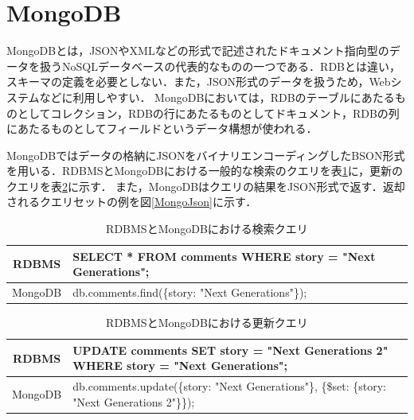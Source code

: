 \documentclass[a4paper,11pt]{ujreport}
\begin{document}
\section{MongoDB}
MongoDBとは，JSONやXMLなどの形式で記述されたドキュメント指向型のデータを扱うNoSQLデータベースの代表的なものの一つである．RDBとは違い，スキーマの定義を必要としない\cite{太田201204}\cite{mongodb}．また，JSON形式のデータを扱うため，Webシステムなどに利用しやすい．
MongoDBにおいては，RDBのテーブルにあたるものとしてコレクション，RDBの行にあたるものとしてドキュメント，RDBの列にあたるものとしてフィールドというデータ構想が使われる．

MongoDBではデータの格納にJSONをバイナリエンコーディングしたBSON形式を用いる\cite{Harrison201512}．RDBMSとMongoDBにおける一般的な検索のクエリを表\ref{table:RDB_Mongo_Find}に，更新のクエリを表\ref{table:RDB_Mongo_Update}に示す．
また，MongoDBはクエリの結果をJSON形式で返す．返却されるクエリセットの例を図\ref{MongoJson}に示す．
\begin{table}[htb]
  \begin{center}
    \caption{RDBMSとMongoDBにおける検索クエリ}
		\label{table:RDB_Mongo_Find}
    \begin{tabular}{|c|l|} \hline
			RDBMS & SELECT * FROM comments WHERE story = "Next Generations";\\ \hline
			MongoDB & db.comments.find(\{story: "Next Generations"\});\\ \hline
    \end{tabular}
  \end{center}
\end{table}
\begin{table}[htb]
  \begin{center}
    \caption{RDBMSとMongoDBにおける更新クエリ}
		\label{table:RDB_Mongo_Update}
    \begin{tabular}{|c|l|} \hline
			RDBMS & UPDATE comments SET story = "Next Generations 2" WHERE story = "Next Generations";\\ \hline
			MongoDB & db.comments.update(\{story: "Next Generations"\}, \{\$set: \{story: "Next Generations 2"\}\});\\ \hline
    \end{tabular}
  \end{center}
\end{table}
\end{document}
